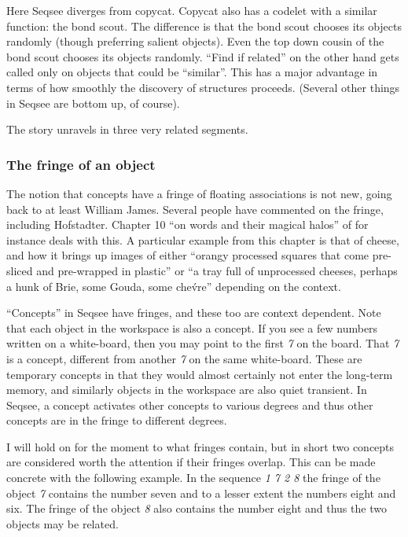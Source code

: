 Here Seqsee diverges from copycat.  Copycat also has a codelet with a similar function: the bond scout.  The difference is that the bond scout chooses its objects randomly (though preferring salient objects).  Even the top down cousin of the bond scout chooses its objects randomly.  ``Find if related'' on the other hand gets called only on objects that could be ``similar''.  This has a major advantage in terms of how smoothly the discovery of structures proceeds.  (Several other things in Seqsee are bottom up, of course).

The story unravels in three very related segments.

\subsubsection{The fringe of an object}
\label{sec:fringe}

The notion that concepts have a fringe of floating associations is not new, going back to at least William James.  Several people have commented on the fringe, including Hofstadter.  Chapter 10 ``on words and their magical halos'' of \cite{Hofstadter:LeTon} for instance deals with this.  A particular example from this chapter is that of cheese, and how it brings up images of either ``orangy processed squares that come pre-sliced and pre-wrapped in plastic'' or ``a tray full of unprocessed cheeses, perhaps a hunk of Brie, some Gouda, some che\'vre'' depending on the context.

``Concepts'' in Seqsee have fringes, and these too are context dependent.  Note that each object in the workspace is also a concept.  If you see a few numbers written on a white-board, then you may point to the first \emph{7} on the board.  That \emph{7} is a concept, different from another \emph{7} on the same white-board.  These are temporary concepts in that they would almost certainly not enter the long-term memory, and similarly objects in the workspace are also quiet transient.  In Seqsee, a concept activates other concepts to various degrees and thus other concepts are in the fringe to different degrees.

I will hold on for the moment to what fringes contain, but in short two concepts are considered worth the attention if their fringes overlap.  This can be made concrete with the following example.  In the sequence \emph{1 7 2 8} the fringe of the object \emph{7} contains the number seven and to a lesser extent the numbers eight and six.  The fringe of the object \emph{8} also contains the number eight and thus the two objects may be related.

